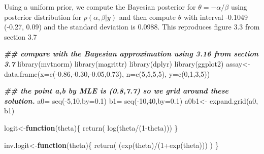 \documentclass[
]{book}
\newenvironment{Shaded}{\begin{snugshade}}{\end{snugshade}}
\newcommand{\AttributeTok}[1]{\textcolor[rgb]{0.77,0.63,0.00}{#1}}
\newcommand{\ControlFlowTok}[1]{\textcolor[rgb]{0.13,0.29,0.53}{\textbf{#1}}}
\newcommand{\DecValTok}[1]{\textcolor[rgb]{0.00,0.00,0.81}{#1}}
\newcommand{\DocumentationTok}[1]{\textcolor[rgb]{0.56,0.35,0.01}{\textbf{\textit{#1}}}}
\newcommand{\FloatTok}[1]{\textcolor[rgb]{0.00,0.00,0.81}{#1}}
\newcommand{\FunctionTok}[1]{\textcolor[rgb]{0.00,0.00,0.00}{#1}}
\newcommand{\NormalTok}[1]{#1}
\newcommand{\OtherTok}[1]{\textcolor[rgb]{0.56,0.35,0.01}{#1}}
\newcommand{\SpecialCharTok}[1]{\textcolor[rgb]{0.00,0.00,0.00}{#1}}
\theoremstyle{definition}
\theoremstyle{definition}
\theoremstyle{definition}
\theoremstyle{definition}
\theoremstyle{remark}
\begin{document}
Using a uniform prior, we compute the Bayesian posterior for \(\theta=-\alpha/\beta\) using posterior distribution for \(p(\alpha,\beta|y)\) and then compute \(\theta\) with interval -0.1049 (-0.27, 0.09) and the standard deviation is 0.0988. This reproduces figure 3.3 from section 3.7

\begin{Shaded}
\begin{Highlighting}[]
 \DocumentationTok{\#\# compare with the Bayesian approximation using 3.16 from section 3.7}
 \FunctionTok{library}\NormalTok{(mvtnorm)}
 \FunctionTok{library}\NormalTok{(magrittr)}
 \FunctionTok{library}\NormalTok{(dplyr)}
 \FunctionTok{library}\NormalTok{(ggplot2)}
\NormalTok{ assay}\OtherTok{\textless{}{-}}\FunctionTok{data.frame}\NormalTok{(}\AttributeTok{x=}\FunctionTok{c}\NormalTok{(}\SpecialCharTok{{-}}\FloatTok{0.86}\NormalTok{,}\SpecialCharTok{{-}}\FloatTok{0.30}\NormalTok{,}\SpecialCharTok{{-}}\FloatTok{0.05}\NormalTok{,}\FloatTok{0.73}\NormalTok{), }\AttributeTok{n=}\FunctionTok{c}\NormalTok{(}\DecValTok{5}\NormalTok{,}\DecValTok{5}\NormalTok{,}\DecValTok{5}\NormalTok{,}\DecValTok{5}\NormalTok{), }\AttributeTok{y=}\FunctionTok{c}\NormalTok{(}\DecValTok{0}\NormalTok{,}\DecValTok{1}\NormalTok{,}\DecValTok{3}\NormalTok{,}\DecValTok{5}\NormalTok{))}

 \DocumentationTok{\#\# the point a,b by MLE is (0.8,7.7) so we grid around these solution.}
\NormalTok{ a0}\OtherTok{=} \FunctionTok{seq}\NormalTok{(}\SpecialCharTok{{-}}\DecValTok{5}\NormalTok{,}\DecValTok{10}\NormalTok{,}\AttributeTok{by=}\FloatTok{0.1}\NormalTok{)}
\NormalTok{ b1}\OtherTok{=} \FunctionTok{seq}\NormalTok{(}\SpecialCharTok{{-}}\DecValTok{10}\NormalTok{,}\DecValTok{40}\NormalTok{,}\AttributeTok{by=}\FloatTok{0.1}\NormalTok{)}
\NormalTok{  a0b1}\OtherTok{\textless{}{-}} \FunctionTok{expand.grid}\NormalTok{(a0, b1)}

\NormalTok{logit}\OtherTok{\textless{}{-}}\ControlFlowTok{function}\NormalTok{(theta)\{}
  \FunctionTok{return}\NormalTok{( }\FunctionTok{log}\NormalTok{(theta}\SpecialCharTok{/}\NormalTok{(}\DecValTok{1}\SpecialCharTok{{-}}\NormalTok{theta)))}
\NormalTok{\}}

\NormalTok{inv.logit}\OtherTok{\textless{}{-}}\ControlFlowTok{function}\NormalTok{(theta)\{}
  \FunctionTok{return}\NormalTok{( (}\FunctionTok{exp}\NormalTok{(theta)}\SpecialCharTok{/}\NormalTok{(}\DecValTok{1}\SpecialCharTok{+}\FunctionTok{exp}\NormalTok{(theta)))  )}
\NormalTok{\}}


\end{Highlighting}
\end{Shaded}
\end{document}
